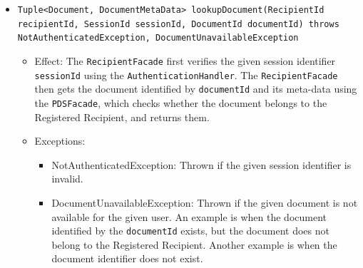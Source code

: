 \documentclass[a4paper,10pt]{article}
\begin{document}
\begin{itemize}
\begin{itemize}
      \item \texttt{Tuple<Document, DocumentMetaData> lookupDocument(RecipientId recipientId, SessionId sessionId, DocumentId documentId) throws NotAuthenticatedException, DocumentUnavailableException}  
        \begin{itemize}
            \item Effect: The \texttt{RecipientFacade} first verifies the given session identifier \texttt{sessionId} using the \texttt{AuthenticationHandler}. The \texttt{RecipientFacade} then gets the document identified by \texttt{documentId} and its meta-data using the \texttt{PDSFacade}, which checks whether the document belongs to the Registered Recipient, and returns them.
            \item Exceptions:
             \begin{itemize}
                \item NotAuthenticatedException: Thrown if the given session identifier is invalid.
                \item DocumentUnavailableException: Thrown if the given document is not available for the given user. An example is when the document identified by the \texttt{documentId} exists, but the document does not belong to the Registered Recipient. Another example is when the document identifier does not exist.
            \end{itemize}       	
        \end{itemize}


\end{itemize}
\end{itemize}
\end{document}
